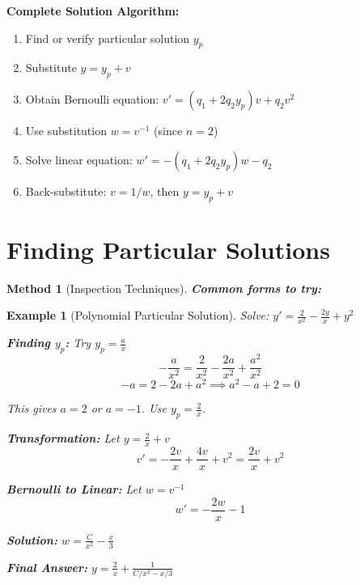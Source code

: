 \documentclass[12pt]{article}
\newtheorem{method}{Method}
\newtheorem{example}{Example}
\begin{document}
\begin{transformation}
\textbf{Complete Solution Algorithm:}
\begin{enumerate}
    \item Find or verify particular solution $y_p$
    \item Substitute $y = y_p + v$
    \item Obtain Bernoulli equation: $v' = (q_1 + 2q_2y_p)v + q_2v^2$
    \item Use substitution $w = v^{-1}$ (since $n = 2$)
    \item Solve linear equation: $w' = -(q_1 + 2q_2y_p)w - q_2$
    \item Back-substitute: $v = 1/w$, then $y = y_p + v$
\end{enumerate}
\end{transformation}

\section{Finding Particular Solutions}

\begin{method}[Inspection Techniques]
\textbf{Common forms to try:}
\end{method}

\begin{example}[Polynomial Particular Solution]
Solve: $y' =  -  + y^2$

\textbf{Finding $y_p$:} Try $y_p = $
$$-\frac{a}{x^2} = \frac{2}{x^2} - \frac{2a}{x^2} + \frac{a^2}{x^2}$$
$$-a = 2 - 2a + a^2 \implies a^2 - a + 2 = 0$$

This gives $a = 2$ or $a = -1$. Use $y_p = $.

\textbf{Transformation:} Let $y =  + v$
$$v' = -\frac{2v}{x} + \frac{4v}{x} + v^2 = \frac{2v}{x} + v^2$$

\textbf{Bernoulli to Linear:} Let $w = v^{-1}$
$$w' = -\frac{2w}{x} - 1$$

\textbf{Solution:} $w =  - $

\textbf{Final Answer:} $y =  + $
\end{example}
\end{document}
